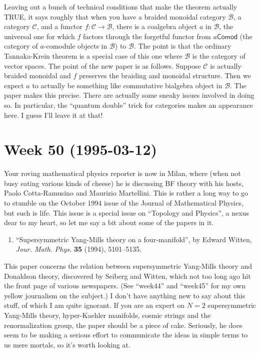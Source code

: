 \documentclass{article}
\def\tightlist{}
\begin{document}
Leaving out a bunch of technical conditions that make the theorem
actually TRUE, it says roughly that when you have a braided monoidal
category \(\mathcal{B}\), a category \(\mathcal{C}\), and a functor
\(f\colon \mathcal{C} \to \mathcal{B}\), there is a coalgebra object
\(a\) in \(\mathcal{B}\), the universal one for which \(f\) factors
through the forgetful functor from \(a\mathsf{Comod}\) (the category of
\(a\)-comodule objects in \(\mathcal{B}\)) to \(\mathcal{B}\). The point
is that the ordinary Tannaka-Krein theorem is a special case of this one
where \(\mathcal{B}\) is the category of vector spaces. The point of the
new paper is as follows. Suppose \(\mathcal{C}\) is actually braided
monoidal and \(f\) preserves the braiding and monoidal structure. Then
we expect \(a\) to actually be something like commutative bialgebra
object in \(\mathcal{B}\). The paper makes this precise. There are
actually some sneaky issues involved in doing so. In particular, the
``quantum double'' trick for categories makes an appearance here. I
guess I'll leave it at that!
\hypertarget{week-50-1995-03-12}{%
\section{Week 50 (1995-03-12)}\label{week-50-1995-03-12}}

Your roving mathematical physics reporter is now in Milan, where (when
not busy eating various kinds of cheese) he is discussing BF theory with
his hosts, Paolo Cotta-Ramusino and Maurizio Martellini. This is rather
a long way to go to stumble on the October 1994 issue of the Journal of
Mathematical Physics, but such is life. This issue is a special issue on
``Topology and Physics'', a nexus dear to my heart, so let me say a bit
about some of the papers in it.

\begin{enumerate}
\def\labelenumi{\arabic{enumi})}
\tightlist
\item
  ``Supersymmetric Yang-Mills theory on a four-manifold'', by Edward
  Witten, \emph{Jour. Math. Phys.} \textbf{35} (1994), 5101--5135.
\end{enumerate}

This paper concerns the relation between supersymmetric Yang-Mills
theory and Donaldson theory, discovered by Seiberg and Witten, which not
too long ago hit the front page of various newspapers. (See ``week44''
and ``week45'' for my own yellow journalism on the subject.) I don't
have anything new to say about this stuff, of which I am quite ignorant.
If you are an expert on \(N = 2\) supersymmetric Yang-Mills theory,
hyper-Kaehler manifolds, cosmic strings and the renormalization group,
the paper should be a piece of cake. Seriously, he does seem to be
making a serious effort to communicate the ideas in simple terms to us
mere mortals, so it's worth looking at.
\end{document}
